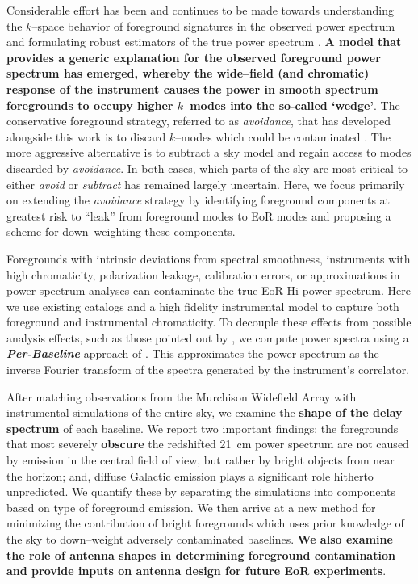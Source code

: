 \documentclass[preprint2,iop,numberedappendix]{emulateapj}
\begin{document}
Considerable effort has been and continues to be made towards understanding the $k$--space behavior of foreground signatures in the observed power spectrum and formulating robust estimators of the true power spectrum \citep{bow09,liu09,dat10,liu11,mor12,tro12,pob13,thy13,dil14,liu14a,liu14b}. {\bf A model that provides a generic explanation for the observed foreground power spectrum has emerged, whereby the wide--field (and chromatic) response of the instrument causes the power in smooth spectrum foregrounds to occupy higher $k$--modes into the so-called `wedge'}. %
The conservative foreground strategy, referred to as {\it avoidance}, that has developed alongside this work is to discard $k$--modes which could be contaminated \citep[for e.g.,][]{par14}. The more aggressive alternative is to subtract a sky model and regain access to modes discarded by {\it avoidance}. In both cases, which parts of the sky are most critical to either {\it avoid} or {\it subtract} has remained largely uncertain. Here, we focus primarily on extending the {\it avoidance} strategy by identifying foreground components at greatest risk to ``leak'' from foreground modes to EoR modes and proposing a scheme for down--weighting these components.

Foregrounds with intrinsic deviations from spectral smoothness, instruments with high chromaticity, polarization leakage, calibration errors, or approximations in power spectrum analyses can contaminate the true EoR H{\sc i} power spectrum. Here we use existing catalogs and a high fidelity instrumental model to capture both foreground and instrumental chromaticity. To decouple these effects from possible analysis effects, such as those pointed out by \citet{haz13}, we compute power spectra using a {\it \textbf{Per-Baseline}} approach of \citet{par12b}. This approximates the power spectrum as the inverse Fourier transform of the spectra generated by the instrument's correlator. 

After matching observations from the Murchison Widefield Array with instrumental simulations of the entire sky, we examine the {\bf shape of the delay spectrum} of each baseline. We report two important findings: the foregrounds that most severely {\bf obscure} the redshifted 21~cm power spectrum are not caused by emission in the central field of view, but rather by bright objects from near the horizon; and, diffuse Galactic emission plays a significant role hitherto unpredicted. We quantify these by separating the simulations into components based on type of foreground emission. We then arrive at a new method for minimizing the contribution of bright foregrounds which uses prior knowledge of the sky to down--weight adversely contaminated baselines. {\bf We also examine the role of antenna shapes in determining foreground contamination and provide inputs on antenna design for future EoR experiments}.
\end{document}
